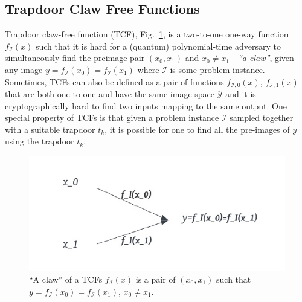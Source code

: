 \documentclass[cryptography,review,submit,pdftex,moreauthors,amsmath,amssymb,aps,strict]{Definitions/mdpi}
\begin{document}
\subsection{Trapdoor Claw Free Functions}\label{TCFs}


Trapdoor claw-free function (TCF), Fig.~\ref{fig:TCF}, is a two-to-one one-way function $f_\mathcal{I}(x)$ such that it is hard for a (quantum) polynomial-time adversary to simultaneously find the preimage pair $(x_0,x_1)$ and $x_0\neq x_1$ - \textit{``a claw''}, given any image $y = f_{\mathcal{I}}(x_0)=f_{\mathcal{I}}(x_1)$  where $\mathcal{I}$ is some problem instance. Sometimes, TCFs can also be defined as a pair of functions $f_{\mathcal{I},0}(x)$, $f_{\mathcal{I},1}(x)$ that are both one-to-one and have the same image space $\mathcal{Y}$ and it is cryptographically hard to find two inputs mapping to the same output. One special property of TCFs is that given a problem instance $\mathcal{I}$ sampled together with a suitable trapdoor $t_{k}$, it is possible for one to find all the pre-images of $y$ using the trapdoor $t_{k}$. 

\begin{figure}[!htb]
	\centering
	\includegraphics[]{figures/TCF.pdf}
	\caption{``A claw'' of a TCFs $f_{\mathcal{I}}(x)$ is a pair of $(x_0,x_1)$ such that $y=f_{\mathcal{I}}(x_0)=f_{\mathcal{I}}(x_1)$, $x_0\neq x_1$.}\label{fig:TCF}
\end{figure}
\end{document}
